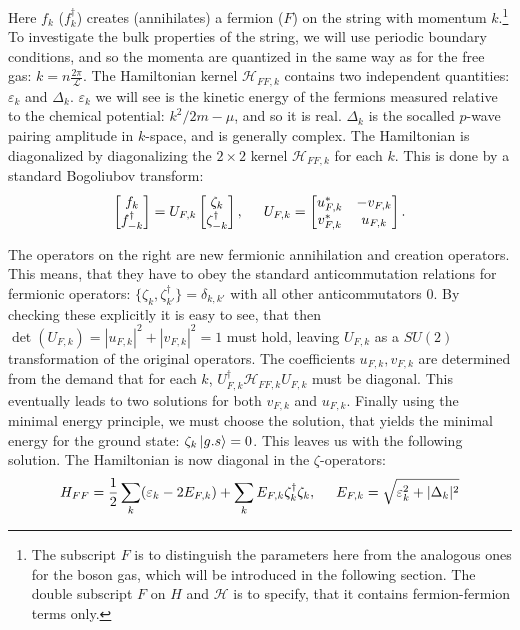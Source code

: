 Here $f_k$ ($f_k^\dagger$) creates (annihilates) a fermion ($F$) on the string with momentum $k$.\footnote{The subscript $F$ is to distinguish the parameters here from the analogous ones for the boson gas, which will be introduced in the following section. The double subscript $F$ on $H$ and $\mathcal{H}$ is to specify, that it contains fermion-fermion terms only.} To investigate the bulk properties of the string, we will use periodic boundary conditions, and so the momenta are quantized in the same way as for the free gas: $k = n\frac{2\pi}{\mathcal{L}}$. The Hamiltonian kernel $\mathcal{H}_{FF,k}$ contains two independent quantities: $\varepsilon_k$ and $\Delta_k$. $\varepsilon_k$ we will see is the kinetic energy of the fermions measured relative to the chemical potential: $k^2/2m-\mu$, and so it is real. $\Delta_k$ is the socalled $p$-wave pairing amplitude in $k$-space, and is generally complex. The Hamiltonian is diagonalized by diagonalizing the $2\times 2$ kernel $\mathcal{H}_{FF,k}$ for each $k$. This is done by a standard Bogoliubov transform: 
\begin{equation}
 \begin{bmatrix} f_k \\ f_{-k}^\dagger \end{bmatrix} = U_{F,k} \begin{bmatrix} \zeta_k \\ \zeta^\dagger_{-k} \end{bmatrix}, \hspace{0.5cm} U_{F,k} = \begin{bmatrix} u^*_{F,k} & -v_{F,k} \\ v^*_{F,k} & u_{F,k} \end{bmatrix}. 
 \label{eq.fermionquasiparticledef}
\end{equation}

The operators on the right are new fermionic annihilation and creation operators. This means, that they have to obey the standard anticommutation relations for fermionic operators: $\{\zeta_k,\zeta_{k'}^\dagger \} = \delta_{k,k'}$ with all other anticommutators 0. By checking these explicitly it is easy to see, that then $\det(U_{F,k}) = |u_{F,k}|^2+|v_{F,k}|^2 = 1$ must hold, leaving $U_{F,k}$ as a $SU(2)$ transformation of the original operators. The coefficients $u_{F,k}, v_{F,k}$ are determined from the demand that for each $k$, $U^\dagger_{F,k} \mathcal{H}_{FF,k}U_{F,k}$ must be diagonal. This eventually leads to two solutions for both $v_{F,k}$ and $u_{F,k}$. Finally using the minimal energy principle, we must choose the solution, that yields the minimal energy for the ground state: $\zeta_k\ket{g.s} = 0$. This leaves us with the following solution. The Hamiltonian is now diagonal in the $\zeta$-operators: 
\begin{equation}
H_{FF} = \frac{1}{2}\sum_k (\varepsilon_k-2E_{F,k}) + \sum_k E_{F,k} \zeta^\dagger_k \zeta_k, \hspace{0.5cm} E_{F,k} = \sqrt{\varepsilon_k^2 + |\Delta_k|^2}
\label{eq.Kitaev.H_diagonalpre}
\end{equation}

